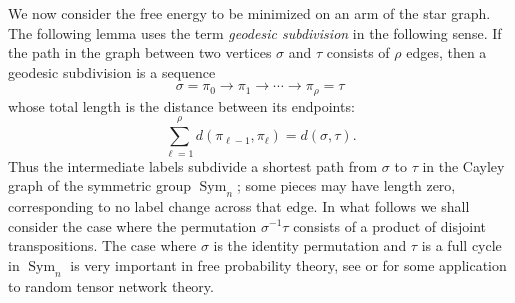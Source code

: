 \documentclass[11pt,oneside,letterpaper]{article}
\numberwithin{equation}{section}
\theoremstyle{definition}
\theoremstyle{remark}
\DeclareMathOperator{\Sym}{Sym}
\begin{document}
We now consider the free energy to be minimized on an arm of the star graph.
The following lemma uses the term \emph{geodesic subdivision} in the
following sense.  If the path in the graph between two vertices $\sigma$ and $\tau$ consists of $\rho$ edges, then a geodesic subdivision is a sequence
\begin{equation}
  \sigma=\pi_0 \to \pi_1 \to \cdots \to \pi_\rho=\tau
\end{equation}
whose total length is the distance between its endpoints:
\begin{equation}
  \sum_{\ell=1}^{\rho}d(\pi_{\ell-1},\pi_\ell)=d(\sigma,\tau).
\end{equation}
Thus the intermediate labels subdivide a shortest path from $\sigma$ to
$\tau$ in the Cayley graph of the symmetric group $\Sym_n$; some pieces may have length zero, corresponding to no label change across that edge. In what follows we shall consider the case where the permutation $\sigma^{-1}\tau$ consists of a product of disjoint transpositions. The case where $\sigma$ is the identity permutation and $\tau$ is a full cycle in $\Sym_n$ is very important in free probability theory, see \cite{banica2011free} or \cite{Fitter:2024nxn,Hu:2025geh} for some application to random tensor network theory.
\end{document}
